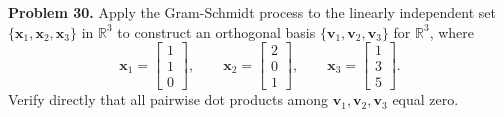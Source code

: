 \documentclass[11pt, letterpaper]{article}
\theoremstyle{definition}
\theoremstyle{remark}
\begin{document}
\textbf{Problem 30.} Apply the Gram-Schmidt process to the linearly independent set $\{\mathbf{x}_1, \mathbf{x}_2, \mathbf{x}_3\}$ in $\mathbb{R}^3$ to construct an orthogonal basis $\{\mathbf{v}_1, \mathbf{v}_2, \mathbf{v}_3\}$ for $\mathbb{R}^3$, where
\[
\mathbf{x}_1 = \begin{bmatrix} 1 \\ 1 \\ 0 \end{bmatrix}, \qquad
\mathbf{x}_2 = \begin{bmatrix} 2 \\ 0 \\ 1 \end{bmatrix}, \qquad
\mathbf{x}_3 = \begin{bmatrix} 1 \\ 3 \\ 5 \end{bmatrix}.
\]
Verify directly that all pairwise dot products among $\mathbf{v}_1, \mathbf{v}_2, \mathbf{v}_3$ equal zero.
\end{document}
